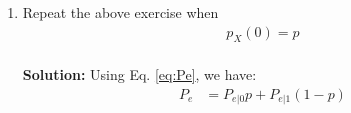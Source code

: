 \documentclass[journal,12pt,twocolumn]{IEEEtran}
\numberwithin{equation}{section}
\renewcommand\thesection{\arabic{section}}
\providecommand{\pr}[1]{\ensuremath{\Pr\left(#1\right)}}
\newcommand{\solution}{\noindent \textbf{\\ Solution: }}
\begin{document}
\begin{enumerate}[label=\thesection.\arabic*
        ,ref=\thesection.\theenumi]
\begin{align}
                      & = \pr{N + A< \delta }                                                       \\
                      & = \pr{N < \delta - A}                                                       \\
                      & = \int _{-\infty} ^{\delta - A} \dfrac{e^{-\frac{x^2}{2}}}{\sqrt{2\pi}}  dx \\
                      & = \int _{A - \delta} ^{\infty} \dfrac{e^{-\frac{x^2}{2}}}{\sqrt{2\pi}} dx   \\
                      & = Q_N(A - \delta)                                                           \\
          \end{align}
          Similarly,
          \begin{align}
              P_{e|1} & = Q_N(A+\delta)
          \end{align}
          Thus,
          \begin{align}
              \label{eq:Pe}
              P_e & = P_{e|0} \pr{X = 1} + P_{e|1} \pr{X = -1}    \\
                  & = \frac{Q_N(A - \delta) + Q_N(A + \delta)}{2}
          \end{align}
          To maximize $P_e$, differentiate the above equation w.r.t $\delta$ and equate it to $0$:
          \begin{align}
              0 & = \frac{d}{d\delta} \left(\dfrac{Q_N(A - \delta) + Q_N(A + \delta)}{2}\right)                                                        \\
                & = \frac{1}{2} \left(\frac{1}{\sqrt{2\pi}} e^{-\frac{(\delta - A)^2}{2}} - \frac{1}{\sqrt{2\pi}} e^{-\frac{(A + \delta)^2}{2}}\right) \\
          \end{align}
          Thus,
          \begin{align}
                       & (\delta - A)^2   = (\delta + A)^2 \\
              \implies & \delta  = 0
          \end{align}
    \item Repeat the above exercise when
          \begin{align}
              p_{X}(0) = p
          \end{align}
          \solution
          Using Eq. \eqref{eq:Pe}, we have:
          \begin{align}
              P_e & = P_{e|0} p+ P_{e|1} (1-p)                 \\

\end{align}
\end{enumerate}
\end{document}
